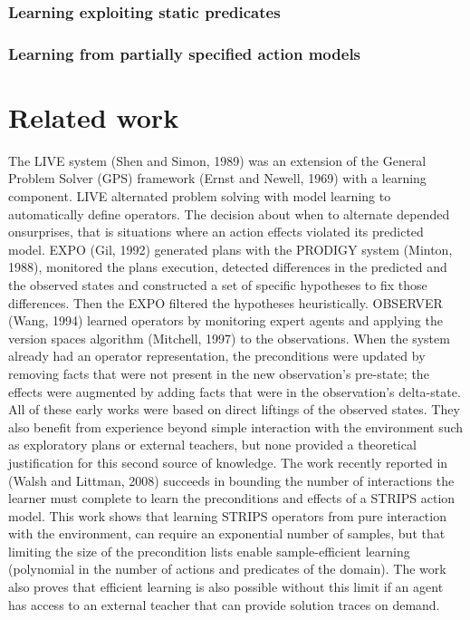 \documentclass[letterpaper]{article} %
\begin{document}
\subsubsection{Learning exploiting static predicates}
\subsubsection{Learning from partially specified action models}





\section{Related work}

The  LIVE  system  (Shen  and  Simon,  1989)  was  an  extension  of  the  General  Problem  Solver  (GPS) framework (Ernst and Newell, 1969) with a learning component. LIVE alternated problem solving with model  learning  to  automatically  define  operators.  The  decision  about  when  to  alternate  depended  onsurprises,  that  is  situations  where  an  action  effects  violated  its  predicted  model.  EXPO  (Gil,  1992) generated plans with the  PRODIGY  system (Minton, 1988), monitored the plans execution, detected differences in the predicted and the observed states and constructed a set of specific hypotheses to fix those differences. Then the  EXPO  filtered the hypotheses heuristically.  OBSERVER  (Wang, 1994) learned operators by monitoring expert agents and applying the version spaces algorithm (Mitchell, 1997) to the observations. When the system already had an operator representation, the preconditions were updated by removing facts that were not present in the new observation’s pre-state; the effects were augmented by adding facts that were in the observation’s delta-state. All of these early works were based on direct liftings of the observed states. They also benefit from experience beyond simple interaction with the environment such as exploratory plans or external teachers, but  none  provided  a  theoretical  justification  for  this  second  source  of  knowledge.  The  work  recently reported in (Walsh and Littman, 2008) succeeds in bounding the number of interactions the learner must complete to learn the preconditions and effects of a STRIPS action model. This work shows that learning STRIPS  operators  from  pure  interaction  with  the  environment,  can  require  an  exponential  number  of samples, but that limiting the size of the precondition lists enable sample-efficient learning (polynomial in the number of actions and predicates of the domain). The work also proves that efficient learning is also possible without this limit if an agent has access to an external teacher that can provide solution traces on demand.
\end{document}
